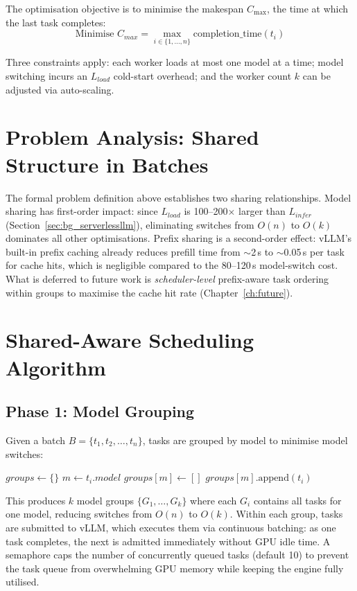 \documentclass[logo,bsc,singlespacing,parskip,online]{infthesis}
\begin{document}
The optimisation objective is to minimise the makespan $C_{\max}$, the time at which the last task completes:
$$\text{Minimise } C_{max} = \max_{i \in \{1,...,n\}} \text{completion\_time}(t_i)$$

Three constraints apply: each worker loads at most one model at a time; model switching incurs an $L_{load}$ cold-start overhead; and the worker count $k$ can be adjusted via auto-scaling.

\section{Problem Analysis: Shared Structure in Batches}

The formal problem definition above establishes two sharing relationships. Model sharing has first-order impact: since $L_{load}$ is 100--200$\times$ larger than $L_{infer}$ (Section~\ref{sec:bg_serverlessllm}), eliminating switches from $O(n)$ to $O(k)$ dominates all other optimisations. Prefix sharing is a second-order effect: vLLM's built-in prefix caching already reduces prefill time from $\sim$2\,s to $\sim$0.05\,s per task for cache hits, which is negligible compared to the 80--120\,s model-switch cost. What is deferred to future work is \emph{scheduler-level} prefix-aware task ordering within groups to maximise the cache hit rate (Chapter~\ref{ch:future}).

\section{Shared-Aware Scheduling Algorithm}


\subsection{Phase 1: Model Grouping}

Given a batch $B = \{t_1, t_2, \ldots, t_n\}$, tasks are grouped by model to minimise model switches:

\begin{algorithmic}
\STATE $groups \gets \{\}$
  \STATE $m \gets t_i.model$
    \STATE $groups[m] \gets []$
  \ENDIF
  \STATE $groups[m].\text{append}(t_i)$
\ENDFOR
\end{algorithmic}

This produces $k$ model groups $\{G_1, \ldots, G_k\}$ where each $G_i$ contains all tasks for one model, reducing switches from $O(n)$ to $O(k)$. Within each group, tasks are submitted to vLLM, which executes them via continuous batching: as one task completes, the next is admitted immediately without GPU idle time. A semaphore caps the number of concurrently queued tasks (default 10) to prevent the task queue from overwhelming GPU memory while keeping the engine fully utilised.
\end{document}

